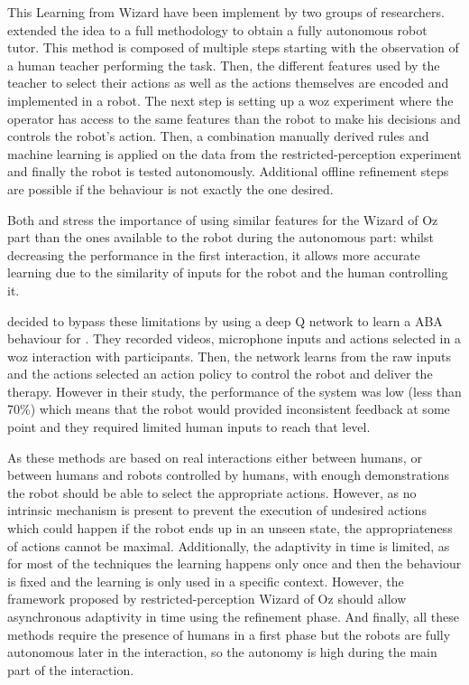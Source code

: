     This Learning from Wizard have been implement by two groups of researchers. \citet{sequeira2016discovering} extended the idea to a full methodology to obtain a fully autonomous robot tutor. This method is composed of multiple steps starting with the observation of a human teacher performing the task. Then, the different features used by the teacher to select their actions as well as the actions themselves are encoded and implemented in a robot. The next step is setting up a \gls{woz} experiment where the operator has access to the same features than the robot to make his decisions and controls the robot's action. Then, a combination manually derived rules and machine learning is applied on the data from the restricted-perception experiment and finally the robot is tested autonomously. Additional offline refinement steps are possible if the behaviour is not exactly the one desired. 
    
    Both \citet{knox2014learning} and \citet{sequeira2016discovering} stress the importance of using similar features for the Wizard of Oz part than the ones available to the robot during the autonomous part: whilst decreasing the performance in the first interaction, it allows more accurate learning due to the similarity of inputs for the robot and the human controlling it.
        
    \cite{clark2018deep} decided to bypass these limitations by using a deep Q network \citep{mnih2015human} to learn a ABA behaviour for . They recorded videos, microphone inputs and actions selected in a \gls{woz} interaction with participants. Then, the network learns from the raw inputs and the actions selected an action policy to control the robot and deliver the therapy. However in their study, the performance of the system was low (less than 70\%) which means that the robot would provided inconsistent feedback at some point and they required limited human inputs to reach that level. 
     
    As these methods are based on real interactions either between humans, or between humans and robots controlled by humans, with enough demonstrations the robot should be able to select the appropriate actions. However, as no intrinsic mechanism is present to prevent the execution of undesired actions which could happen if the robot ends up in an unseen state, the appropriateness of actions cannot be maximal. Additionally, the adaptivity in time is limited, as for most of the techniques the learning happens only once and then the behaviour is fixed and the learning is only used in a specific context. However, the framework proposed by restricted-perception Wizard of Oz should allow asynchronous adaptivity in time using the refinement phase. And finally, all these methods require the presence of humans in a first phase but the robots are fully autonomous later in the interaction, so the autonomy is high during the main part of the interaction.
    
